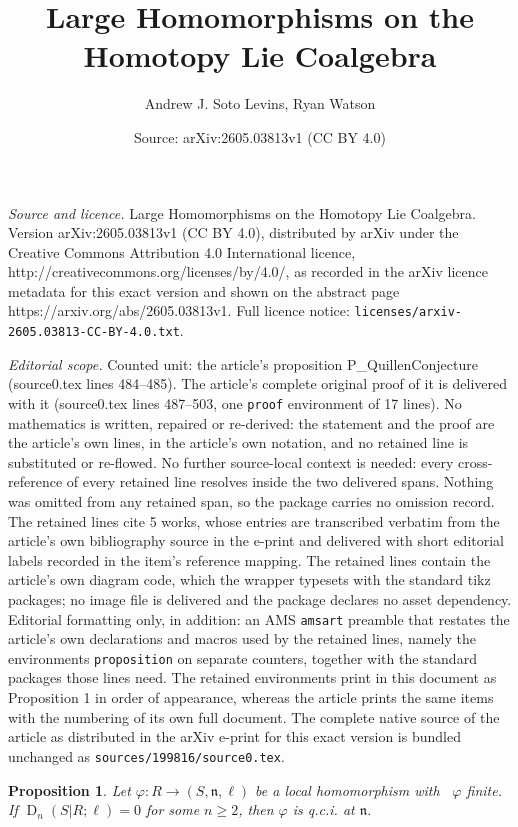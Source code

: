 \documentclass[10pt,a4paper]{amsart}
\title{Large Homomorphisms on the Homotopy Lie Coalgebra}
\author{Andrew J. Soto Levins, Ryan Watson}
\date{Source: arXiv:2605.03813v1 (CC BY 4.0)}
\newtheorem{proposition}{Proposition}
\newcommand{\daq}[4]{\operatorname{D}_{#1}(#2|#3;#4)}
\newcommand{\n}{\mathfrak{n}}
\DeclareMathOperator{\uppercidim}{CI^{*}dim}
\begin{document}
\maketitle

\noindent\emph{Source and licence.} Large Homomorphisms on the Homotopy Lie Coalgebra. Version arXiv:2605.03813v1 (CC BY 4.0), distributed by arXiv under the Creative Commons Attribution 4.0 International licence, http://creativecommons.org/licenses/by/4.0/, as recorded in the arXiv licence metadata for this exact version and shown on the abstract page https://arxiv.org/abs/2605.03813v1. Full licence notice: \texttt{licenses/arxiv-2605.03813-CC-BY-4.0.txt}.\par\smallskip

\noindent\textit{Editorial scope.} Counted unit: the article's proposition P\_QuillenConjecture (source0.tex lines 484--485). The article's complete original proof of it is delivered with it (source0.tex lines 487--503, one \texttt{proof} environment of 17 lines). No mathematics is written, repaired or re-derived: the statement and the proof are the article's own lines, in the article's own notation, and no retained line is substituted or re-flowed.  No further source-local context is needed: every cross-reference of every retained line resolves inside the two delivered spans.  Nothing was omitted from any retained span, so the package carries no omission record.  The retained lines cite 5 works, whose entries are transcribed verbatim from the article's own bibliography source in the e-print and delivered with short editorial labels recorded in the item's reference mapping.  The retained lines contain the article's own diagram code, which the wrapper typesets with the standard tikz packages; no image file is delivered and the package declares no asset dependency.  Editorial formatting only, in addition: an AMS \texttt{amsart} preamble that restates the article's own declarations and macros used by the retained lines, namely the environments \texttt{proposition} on separate counters, together with the standard packages those lines need.  The retained environments print in this document as Proposition 1 in order of appearance, whereas the article prints the same items with the numbering of its own full document.  The complete native source of the article as distributed in the arXiv e-print for this exact version is bundled unchanged as \texttt{sources/199816/source0.tex}.
\begin{proposition} \label{P_QuillenConjecture} Let $\varphi\colon R\rightarrow (S,\n,\ell)$ be a local homomorphism with $\uppercidim{\varphi}$ finite. If $\daq{n}{S}{R}{\ell}=0$ for some $n\geq 2$, then $\varphi$ is q.c.i. at $\n$.
\end{proposition}
\end{document}
